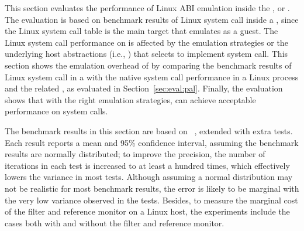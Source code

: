 This section evaluates the performance
of Linux ABI emulation
inside the \graphene{} \libos{},
or \thelibos{}.
The evaluation is based on benchmark results
of Linux system call inside a \picoproc{},
since the Linux system call table is the main target that \thelibos{} emulates
as a guest.
The Linux system call performance
on \thelibos{}
is affected by the emulation strategies
or the underlying host abstractions (i.e., \hostapis{})
that \thelibos{}
selects to implement system call.
This section
shows the emulation overhead of \thelibos{}
by comparing the benchmark results
of Linux system call in a \picoproc{} with the native system call performance in a Linux process
and the related \hostapis{}, as evaluated in Section~\ref{sec:eval:pal}.
Finally,
the evaluation shows that with the right emulation strategies,
\thelibos{} can achieve acceptable performance on system calls.


The benchmark results in this section are based on
\lmbenchwithver{}~\cite{McVoy:lmbench},
extended with extra tests.
Each result
reports a mean and 95\% confidence interval,
assuming the benchmark results are normally distributed;
to improve the precision,
the number of iterations in each test is increased to at least a hundred times, which effectively lowers the variance
in most tests.
Although assuming a normal distribution may not be realistic for most benchmark results,
the error is likely to be marginal with the very low variance
observed in the tests.
Besides, to measure the marginal cost of the \seccomp{} filter and reference monitor on a Linux host,
the experiments include the cases both with
and without the \seccomp{} filter and reference monitor.


